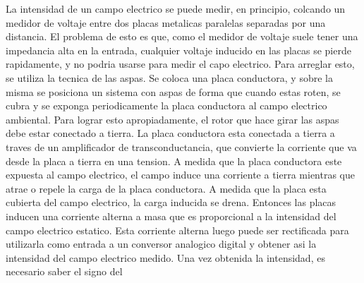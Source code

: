 
La intensidad de un campo electrico se puede medir, en principio, colcando un medidor de voltaje entre dos placas metalicas paralelas separadas por una distancia. El problema de esto es que, como el medidor de voltaje suele tener una impedancia alta en la entrada, cualquier voltaje inducido en las placas se pierde rapidamente, y no podria usarse para medir el capo electrico. Para arreglar esto, se utiliza la tecnica de las aspas. Se coloca una placa conductora, y sobre la misma se posiciona un sistema con aspas de forma que cuando estas roten, se cubra y se exponga periodicamente la placa conductora al campo electrico ambiental. Para lograr esto apropiadamente, el rotor que hace girar las aspas debe estar conectado a tierra. La placa conductora esta conectada a tierra a traves de un amplificador de transconductancia, que convierte la corriente que va desde la placa a tierra en una tension. A medida que la placa conductora este expuesta al campo electrico, el campo induce una corriente a tierra mientras que atrae o repele la carga de la placa conductora. A medida que la placa esta cubierta del campo electrico, la carga inducida se drena. Entonces las placas inducen una corriente alterna a masa que es proporcional a la intensidad del campo electrico estatico. Esta corriente alterna luego puede ser rectificada para utilizarla como entrada a un conversor analogico digital y obtener asi la intensidad del campo electrico medido.
Una vez obtenida la intensidad, es necesario saber el signo del 




